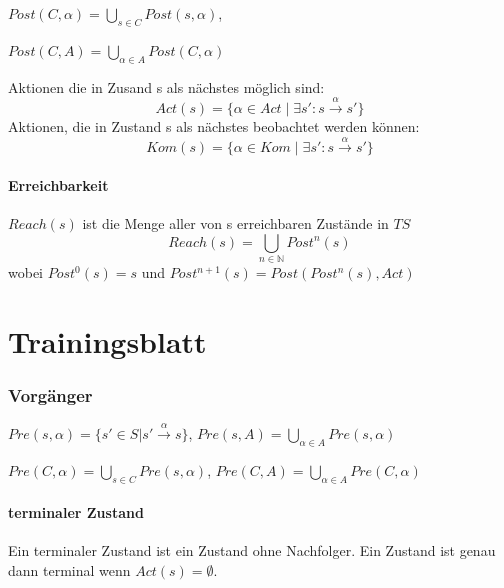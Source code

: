 \documentclass[a4paper,10pt, oneside]{book}
\begin{document}
\begin{flushleft}
 $Post(C,\alpha) = \bigcup\limits_{s \in C} Post(s,\alpha)$,
\end{flushleft}

\begin{flushright}
 $Post(C,A) = \bigcup\limits_{\alpha \in A} Post(C,\alpha)$
\end{flushright}

Aktionen die in Zusand s als nächstes möglich sind:
\begin{equation*}
 Act(s) = \{\alpha \in Act \; | \; \exists s': s \xrightarrow{\alpha} s'\}
\end{equation*}
Aktionen, die in Zustand s als nächstes beobachtet werden können:
\begin{equation*}
 Kom(s) = \{\alpha \in Kom \; | \; \exists s': s \xrightarrow{\alpha} s'\}
\end{equation*}


\paragraph{Erreichbarkeit}
$Reach(s)$ ist die Menge aller von s erreichbaren Zustände in $TS$
\begin{equation*}
 Reach(s) = \bigcup\limits_{n \in \mathds{N}} Post^n(s)
\end{equation*}
wobei $Post^0(s) = {s}$ und $Post^{n+1}(s) = Post(Post^n(s), Act)$

\section{Trainingsblatt}
\subsubsection{Vorgänger}
$Pre(s,\alpha) = \{s' \in S | s' \xrightarrow{\alpha} s\}$, 
\hfill
$Pre(s,A) = \bigcup\limits_{\alpha \in A} Pre(s,\alpha)$

\begin{flushleft}
$Pre(C,\alpha) = \bigcup\limits_{s \in C} Pre(s,\alpha)$,
\hfill
$Pre(C,A) = \bigcup\limits_{\alpha \in A} Pre(C,\alpha)$
\end{flushleft}

\paragraph{terminaler Zustand}
Ein terminaler Zustand ist ein Zustand ohne Nachfolger. Ein Zustand ist genau dann terminal wenn $Act(s) = \emptyset$.
\end{document}
